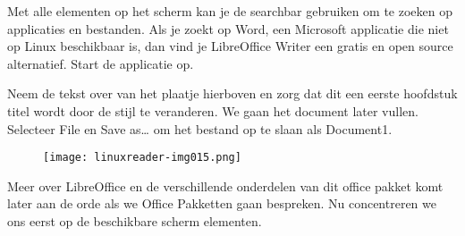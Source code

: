 Met alle elementen op het scherm kan je de searchbar gebruiken om te zoeken op applicaties en bestanden. Als je zoekt op
Word, een Microsoft applicatie die niet op Linux beschikbaar is, dan vind je LibreOffice Writer een gratis en open
source alternatief. Start de applicatie op.

{
Neem de tekst over van het plaatje hierboven en zorg dat dit een eerste hoofdstuk titel wordt door de stijl te
veranderen. We gaan het document later vullen. Selecteer File en Save as{\dots} om het bestand op te slaan als
Document1.}

\begin{figure}[H]
\texttt{[image: linuxreader-img015.png]}
\end{figure}
{
\foreignlanguage{dutch}{Meer over LibreOffice en de verschillende onderdelen van dit office pakket komt later aan de
orde als we Office Pakketten gaan bespreken. Nu concentreren we ons eerst op de beschikbare scherm elementen.}}
